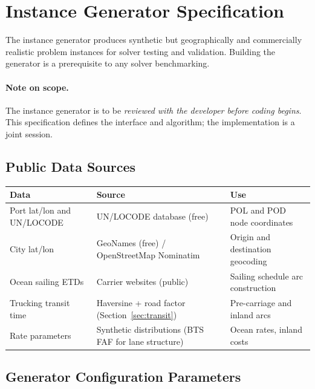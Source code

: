 \documentclass[11pt,a4paper]{article}
\theoremstyle{definition}
\begin{document}
\section{Instance Generator Specification}
\label{sec:instance}

The instance generator produces synthetic but geographically and commercially
realistic problem instances for solver testing and validation. Building the generator
is a prerequisite to any solver benchmarking.

\paragraph{Note on scope.} The instance generator is to be \emph{reviewed with the developer
before coding begins}. This specification defines the interface and algorithm; the
implementation is a joint session.

\subsection{Public Data Sources}

\begin{center}
\begin{tabular}{lll}
\toprule
Data & Source & Use \\
\midrule
Port lat/lon and UN/LOCODE & UN/LOCODE database (free) & POL and POD node coordinates \\
City lat/lon & GeoNames (free) / OpenStreetMap Nominatim & Origin and destination geocoding \\
Ocean sailing ETDs & Carrier websites (public) & Sailing schedule arc construction \\
Trucking transit time & Haversine + road factor (Section~\ref{sec:transit}) & Pre-carriage and inland arcs \\
Rate parameters & Synthetic distributions (BTS FAF for lane structure) & Ocean rates, inland costs \\
\bottomrule
\end{tabular}
\end{center}

\subsection{Generator Configuration Parameters}
\end{document}
